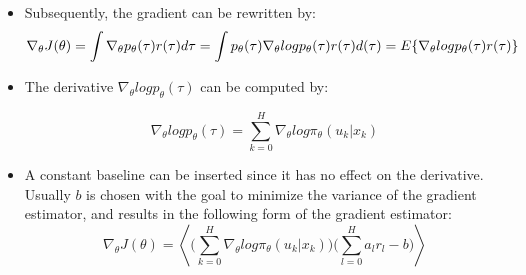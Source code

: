 {\begin{pcolumn}
{\begin{itemize}
 	\item Subsequently, the gradient can be rewritten by:
\begin{equation}
	\nabla_\theta J(\theta) = \int \nabla_\theta p_\theta(\tau) r(\tau) d\tau \nonumber \\
	= \int p_\theta(\tau) \nabla_\theta log p_\theta (\tau) r(\tau) d(\tau) \nonumber \\
	= E \{ \nabla_\theta log p_\theta (\tau) r (\tau)\}
\end{equation}

	\item The derivative $\nabla_\theta log p_\theta (\tau)$ can be computed by:

\begin{equation}
	\nabla_\theta log p_\theta (\tau) = \sum_{k=0}^H \nabla_\theta log \pi_\theta (u_k | x_k)
\end{equation}
	\item A constant baseline can be inserted since it has no effect on the derivative. Usually $b$ is chosen with the goal to minimize the variance of the gradient estimator, and results in the following form of the gradient estimator:
\begin{equation}
	\nabla_\theta J(\theta) = \left<\bigg(\sum_{k=0}^H \nabla_\theta log \pi_\theta (u_k | x_k)\bigg)\bigg(\sum_{l=0}^Ha_l r_l - b\bigg)\right>
\end{equation}

\end{itemize}
\vspace*{2mm}
}


\end{pcolumn}
%
\hfill
\begin{pcolumn}




\end{pcolumn}}
